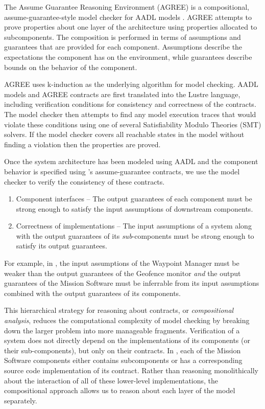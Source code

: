 
The Assume Guarantee Reasoning Environment (AGREE) is a compositional, assume-guarantee-style model
checker for AADL models \cite{compositional-analysis-agree}. AGREE attempts to prove properties about one layer
of the architecture using properties allocated to subcomponents. The composition is performed in
terms of assumptions and guarantees that are provided for each component. Assumptions describe the
expectations the component has on the environment, while guarantees describe bounds on the behavior
of the component. 

AGREE uses k-induction as the underlying algorithm for model checking.  AADL models and AGREE
contracts are first translated into the Lustre language, including verification conditions for consistency
and correctness of the contracts.  The model checker then attempts to find any model execution traces
that would violate these conditions using one of several Satisfiability Modulo Theories (SMT) solvers. 
If the model checker covers all reachable states in the model without finding a violation then the properties are proved. 

Once the system architecture has been modeled using AADL
and the component behavior is specified using \agree's assume-guarantee contracts,
we use the \agree{} model checker to verify the consistency of these contracts.

\begin{enumerate}
\item Component interfaces -- The output guarantees of each component must be strong enough to
satisfy the input assumptions of downstream components. 
\item Correctness of implementations -- The input assumptions of a system along with the 
output guarantees of its \emph{sub}-components must be strong enough to satisfy its output guarantees.
\end{enumerate}

For example, in ,
the input assumptions of the Waypoint Manager must be weaker than
the output guarantees of the Geofence monitor 
\textit{and} the output guarantees of the Mission Software must be inferrable from
its input assumptions combined with the output guarantees of its components.

This hierarchical strategy for reasoning about contracts,
or \emph{compositional analysis},
reduces the computational complexity of model checking
by breaking down the larger problem into more manageable fragments.
Verification of a system does not directly depend on the implementations of its components (or their sub-components),
but only on their contracts.  
In , each of the Mission Software components either contains subcomponents 
or has a corresponding source code implementation of its contract.  
Rather than reasoning monolithically about the interaction of all of these lower-level implementations, 
the compositional approach allows us to reason about each layer of the model separately.  
